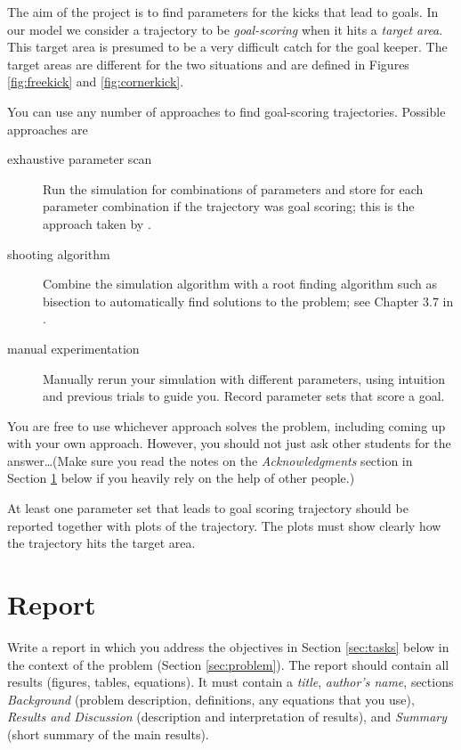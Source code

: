 \documentclass[letterpaper]{scrartcl}
\begin{document}
The aim of the project is to find parameters for the kicks that lead
to goals. In our model we consider a trajectory to be
\emph{goal-scoring} when it hits a \emph{target area}. This target
area is presumed to be a very difficult catch for the goal keeper. The
target areas are different for the two situations and are defined in
Figures \ref{fig:freekick} and \ref{fig:cornerkick}.

You can use any number of approaches to find goal-scoring
trajectories. Possible approaches are
\begin{description}
\item[exhaustive parameter scan] Run the simulation for combinations
  of parameters and store for each parameter combination if the
  trajectory was goal scoring; this is the approach taken by
  \citet{Cook:2006aa}.
\item[shooting algorithm] Combine the simulation algorithm with a root
  finding algorithm such as bisection to automatically find solutions
  to the problem; see Chapter 3.7 in \citet{Wang:2015aa}.
\item[manual experimentation] Manually rerun your simulation with
  different parameters, using intuition and previous trials to guide
  you. Record parameter sets that score a goal.
\end{description}
You are free to use whichever approach solves the problem, including
coming up with your own approach. However, you should not just ask
other students for the answer\dots (Make sure you read the notes on
the \emph{Acknowledgments} section in Section \ref{sec:report} below
if you heavily rely on the help of other people.)

At least one parameter set that leads to goal scoring trajectory
should be reported together with plots of the trajectory. The plots
must show clearly how the trajectory hits the target area.

\section{Report}
\label{sec:report}

Write a report in which you address the objectives in Section
\ref{sec:tasks} below in the context of the problem (Section
\ref{sec:problem}). The report should contain all results (figures,
tables, equations). It must contain a \emph{title}, \emph{author's
  name}, sections \emph{Background} (problem description, definitions,
any equations that you use), \emph{Results and Discussion}
(description and interpretation of results), and \emph{Summary} (short
summary of the main results).
\end{document}
